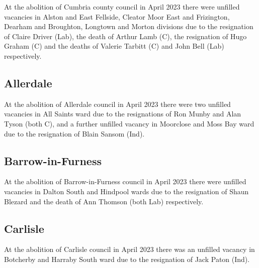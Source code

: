 \documentclass[a4paper,openany]{book}
\begin{document}
\begin{resultsiii}
At the abolition of Cumbria county council in April 2023 there were unfilled vacancies in Alston and East Fellside, Cleator Moor East and Frizington, Dearham and Broughton, Longtown and Morton divisions due to the resignation of Claire Driver (Lab), the death of Arthur Lamb (C), the resignation of Hugo Graham (C) and the deaths of Valerie Tarbitt (C) and John Bell (Lab) respectively.%
%
%
%
%

\subsection*{Allerdale}

At the abolition of Allerdale council in April 2023 there were two unfilled vacancies in All Saints ward due to the resignations of Ron Munby and Alan Tyson (both C), and a further unfilled vacancy in Moorclose and Moss Bay ward due to the resignation of Blain Sansom (Ind).%
%

\subsection*{Barrow-in-Furness}

At the abolition of Barrow-in-Furness council in April 2023 there were unfilled vacancies in Dalton South and Hindpool wards due to the resignation of Shaun Blezard and the death of Ann Thomson (both Lab) respectively.%
%

\subsection*{Carlisle}

At the abolition of Carlisle council in April 2023 there was an unfilled vacancy in Botcherby and Harraby South ward due to the resignation of Jack Paton (Ind).%


\end{resultsiii}
\end{document}

